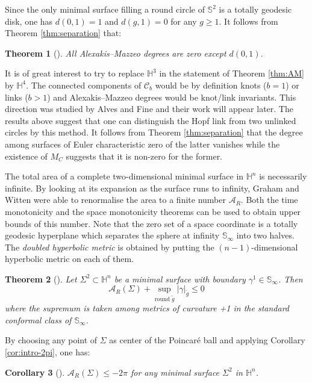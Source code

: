 \documentclass[11pt]{article}
\newtheorem{theorem}{Theorem}
\newtheorem{corollary}[theorem]{Corollary}
\begin{document}
Since the only minimal surface filling a round circle of
\(\mathbb{S}^2\) is a totally geodesic disk, one has \(d(0,1) = 1\) and \(d (g,1)=0\) for any \(g\geq 1\). It follows from Theorem \ref{thm:separation} that:

\begin{theorem}[]
\label{thm:AM-deg}
All Alexakis--Mazzeo degrees are zero except \(d(0,1)\).
\end{theorem}

It is of great interest to try to replace \(\mathbb{H}^3\) in the statement of Theorem \ref{thm:AM} by \(\mathbb{H}^4\). The connected components of \(\mathcal{C}_b\) would be
by definition knots (\(b=1\)) or links (\(b>1\)) and Alexakis--Mazzeo degrees would be knot/link invariants.
This direction was studied by Alves and Fine and their work will appear later. The results above
suggest that one can distinguish the Hopf link from two unlinked circles by this method. It
follows from Theorem \ref{thm:separation} that the degree among surfaces of Euler characteristic zero of the
latter vanishes while the
existence of \(M_C\) suggests that it is non-zero for the former.

The total area of a complete two-dimensional minimal surface in
\(\mathbb{H}^n\) is necessarily infinite. By looking at its expansion as
the surface runs to infinity, Graham and Witten
\cite{Graham.Witten99_ConformalAnomalySubmanifold} were able to renormalise the area to a
finite number \(\mathcal{A}_R\).
Both the time monotonicity and the space monotonicity theorems can be used to obtain upper
bounds of this number. Note that the zero set of a
space coordinate is a totally geodesic hyperplane which separates the sphere at infinity \(\mathbb{S}_\infty\) into two halves. The \emph{doubled
hyperbolic metric} is obtained by putting the \({(n-1)}\)-dimensional hyperbolic metric on 
each of them.

\begin{theorem}[]
\label{thm:upper-AR}
Let \(\Sigma^2\subset \mathbb{H}^n\) be a minimal surface with boundary \(\gamma^1\in
\mathbb{S}_\infty\). Then
\begin{equation}
\label{eq:upper-AR}
 \mathcal{A}_R(\Sigma) + \sup_{\text{round } \tilde g}|\gamma|_{\tilde g} \leq 0
\end{equation}
where the supremum is taken among metrics of curvature +1 in the standard conformal class of \(\mathbb{S}_\infty\). 
\end{theorem}

By choosing any point of \(\Sigma\) as center of the Poincaré ball and
applying Corollary \ref{cor:intro-2pi}, one has: 
\begin{corollary}[]
\label{cor:intro-AR-2pi}
\(\mathcal{A}_R(\Sigma)\leq -2\pi\) for any minimal surface \(\Sigma^2\) in \(\mathbb{H}^n\).
\end{corollary}
\end{document}

